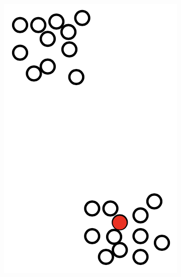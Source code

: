 \documentclass[
	number={6},
	title={Clustering}
]{cs584notes}
\begin{document}
\begin{figure}[H]
	\centering
	\begin{subfigure}[m]{0.2\textwidth}
		\centering
		\includegraphics[width=\textwidth]{figures/6/bad_random_initalization}
	\end{subfigure}
	\hfill
	\begin{subfigure}[m]{0.1\textwidth}
		\centering

\end{subfigure}
\end{figure}
\end{document}
